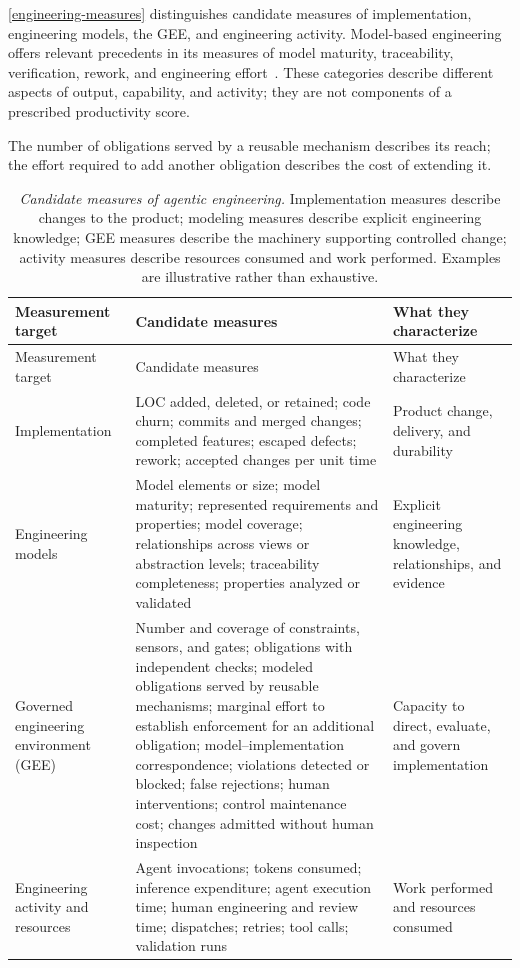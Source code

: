 \autoref{engineering-measures} distinguishes candidate measures of implementation, engineering models, the GEE, and engineering activity. Model-based engineering offers relevant precedents in its measures of model maturity, traceability, verification, rework, and engineering effort~\citep{garcia2021modelproductivity,henderson2023digitalmetrics,campo2023mbse}. These categories describe different aspects of output, capability, and activity; they are not components of a prescribed productivity score.

The number of obligations served by a reusable mechanism describes its reach; the effort required to add another obligation describes the cost of extending it.

{\footnotesize
\begin{longtable}[]{@{}
  >{\raggedright\arraybackslash}p{}
  >{\raggedright\arraybackslash}p{}
  >{\raggedright\arraybackslash}p{}@{}}
\caption[Candidate measures of agentic engineering]{\emph{Candidate measures of agentic engineering.} Implementation measures describe changes to the product; modeling measures describe explicit engineering knowledge; GEE measures describe the machinery supporting controlled change; activity measures describe resources consumed and work performed. Examples are illustrative rather than exhaustive.}\label{engineering-measures}\tabularnewline
\toprule\noalign{}
Measurement target & Candidate measures & What they characterize \\
\midrule\noalign{}
\endfirsthead
\toprule\noalign{}
Measurement target & Candidate measures & What they characterize \\
\midrule\noalign{}
\endhead
\bottomrule\noalign{}
\endlastfoot
Implementation & LOC added, deleted, or retained; code churn; commits and merged changes; completed features; escaped defects; rework; accepted changes per unit time & Product change, delivery, and durability \\
Engineering models & Model elements or size; model maturity; represented requirements and properties; model coverage; relationships across views or abstraction levels; traceability completeness; properties analyzed or validated & Explicit engineering knowledge, relationships, and evidence \\
Governed engineering environment (GEE) & Number and coverage of constraints, sensors, and gates; obligations with independent checks; modeled obligations served by reusable mechanisms; marginal effort to establish enforcement for an additional obligation; model–implementation correspondence; violations detected or blocked; false rejections; human interventions; control maintenance cost; changes admitted without human inspection & Capacity to direct, evaluate, and govern implementation \\
Engineering activity and resources & Agent invocations; tokens consumed; inference expenditure; agent execution time; human engineering and review time; dispatches; retries; tool calls; validation runs & Work performed and resources consumed \\
\end{longtable}
}

